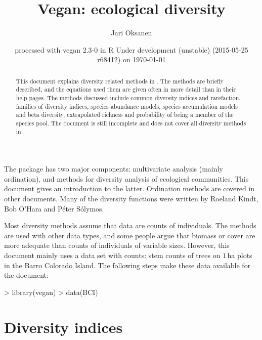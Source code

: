 \documentclass[a4paper,10pt,twocolumn]{article}
\title{Vegan: ecological diversity} \author{Jari Oksanen}
\date{\footnotesize{
  processed with vegan 2.3-0
  in R Under development (unstable) (2015-05-25 r68412) on \today}}
\begin{document}




\maketitle
\begin{abstract} 
  This document explains diversity related methods in
  . The methods are briefly described, and the equations
  used them are given often in more detail than in their help
  pages. The methods discussed include common diversity indices and
  rarefaction, families of diversity indices, species abundance
  models, species accumulation models and beta diversity, extrapolated
  richness and probability of being a member of the species pool. The
  document is still incomplete and does not cover all diversity
  methods in .
\end{abstract}
\tableofcontents


\noindent The  package has two major components:
multivariate analysis (mainly ordination), and methods for diversity
analysis of ecological communities.  This document gives an
introduction to the latter.  Ordination methods are covered in other
documents.  Many of the diversity functions were written by Roeland
Kindt, Bob O'Hara and P{\'e}ter S{\'o}lymos.

Most diversity methods assume that data are counts of individuals.
The methods are used with other data types, and some people argue that
biomass or cover are more adequate than counts of individuals of
variable sizes.  However, this document mainly uses a data set with
counts: stem counts of trees on $1$\,ha plots in the Barro Colorado
Island.  The following steps make these data available for the
document:
\begin{Schunk}
\begin{Sinput}
> library(vegan)
> data(BCI)
\end{Sinput}
\end{Schunk}

\section{Diversity indices}
\end{document}
